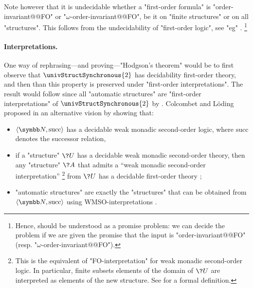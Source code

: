 Note however that it is undecidable whether a "first-order formula" is
"order-invariant@@FO" or "$\omega$-order-invariant@@FO", be it on "finite structures"
or on all "structures". This follows from the undecidability of "first-order logic",
see "eg" \cite[Exercise~3.1.12]{Gradel2007FiniteModelTheory}.%
\footnote{Hence,  should be understood as a promise problem:
we can decide the problem if we are given the promise that the input is
"order-invariant@@FO" (resp. "$\omega$-order-invariant@@FO").}

\paragraph*{Interpretations.}
One way of rephrasing---and proving---"Hodgson's theorem" would be to first observe
that $\univStructSynchronous{2}$ has decidability first-order theory,
and then than this property is preserved under "first-order interpretations".
The result would follow since all "automatic structures" are "first-order interpretations"
of $\univStructSynchronous{2}$ by .
Colcombet and Löding proposed in \cite{ColcombetLoding2007WMSO} an alternative vision
by showing that:
\begin{itemize}
	\item $\tup{\N, \textrm{succ}}$ has a decidable weak monadic second-order logic,
		where $\textrm{succ}$ denotes the successor relation,%
	\item if a "structure" $\?U$ has a decidable weak monadic second-order theory,
		then any "structure" $\?A$ that admits a
		``weak monadic second-order interpretation''%
		\footnote{This is the equivalent
		of "FO-interpretation" for weak monadic second-order logic. In particular,
		finite subsets elements of the domain of $\?U$ are interpreted as elements of
		the new structure. See \cite[\S~2.3]{ColcombetLoding2007WMSO} for a formal definition.}
		from $\?U$ has a decidable first-order theory
		\cite[Corollary~2.5]{ColcombetLoding2007WMSO};
	\item "automatic structures" are exactly the "structures" that can be obtained from
		$\tup{\N, \textrm{succ}}$ using WMSO-interpretations
		\cite[Proposition~3.1]{ColcombetLoding2007WMSO}.
\end{itemize}


